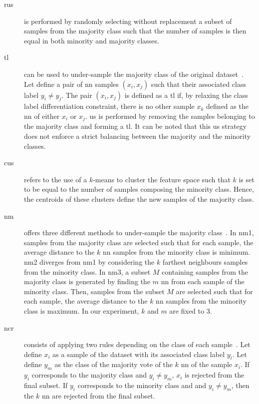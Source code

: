 \begin{description}
  \item[\Ac{rus}] is performed by randomly selecting without replacement a subset of samples from the majority class such that the number of samples is then equal in both minority and majority classes.
  \item[\Ac{tl}] can be used to under-sample the majority class of the original dataset~\cite{tomek1976two}.
Let define a pair of \ac{nn} samples $(x_i, x_j)$ such that their associated class label $y_i \neq y_j$.
The pair $(x_i, x_j)$ is defined as a \ac{tl} if, by relaxing the class label differentiation constraint, there is no other sample $x_k$ defined as the \ac{nn} of either $x_i$ or $x_j$.
\Ac{us} is performed by removing the samples belonging to the majority class and forming a \ac{tl}.
It can be noted that this \ac{us} strategy does not enforce a strict balancing between the majority and the minority classes.
  \item[\Ac{cus}] refers to the use of a $k$-means to cluster the feature space such that $k$ is set to be equal to the number of samples composing the minority class.
Hence, the centroids of these clusters define the new samples of the majority class. 
  \item[\Ac{nm}] offers three different methods to under-sample the majority class~\cite{mani2003knn}.
In \ac{nm1}, samples from the majority class are selected such that for each sample, the average distance to the $k$ \ac{nn} samples from the minority class is minimum.
\ac{nm2} diverges from \ac{nm1} by considering the $k$ farthest neighbours samples from the minority class.
In \ac{nm3}, a subset $M$ containing samples from the majority class is generated by finding the $m$ \ac{nn} from each sample of the minority class.
Then, samples from the subset $M$ are selected such that for each sample, the average distance to the $k$ \ac{nn} samples from the minority class is maximum.
In our experiment, $k$ and $m$ are fixed to 3.
  \item[\Ac{ncr}] consists of applying two rules depending on the class of each sample~\cite{laurikkala2001improving}.
Let define $x_i$ as a sample of the dataset with its associated class label $y_i$.
Let define $y_m$ as the class of the majority vote of the $k$ \ac{nn} of the sample $x_i$.
If $y_i$ corresponds to the majority class and $y_i \neq y_m$, $x_i$ is rejected from the final subset.
If $y_i$ corresponds to the minority class and and $y_i \neq y_m$, then the $k$ \ac{nn} are rejected from the final subset.
\end{description}

